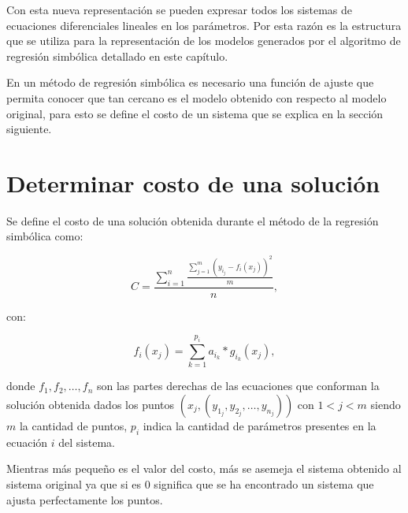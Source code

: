 
Con esta nueva representación se pueden expresar todos los sistemas de ecuaciones diferenciales lineales en los parámetros. Por esta razón es la estructura que se utiliza para la representación de los modelos generados por el algoritmo de regresión simbólica detallado en este capítulo.

En un método de regresión simbólica es necesario una función de ajuste que permita conocer que tan cercano es el modelo obtenido con respecto al modelo original, para esto se define el costo de un sistema que se explica en la sección siguiente.

\section{Determinar costo de una solución}

Se define el costo de una solución obtenida durante el método de la regresión simbólica como:

$$C = \frac{\sum_{i=1}^n\frac{\sum_{j=1}^{m}(y_{i_j} - f_i(x_j))^2}{m}}{n},$$

con:

$$f_i(x_j) = \sum_{k=1}^{p_i} a_{i_k} * g_{i_k}(x_j),$$

donde $f_1, f_2, \dots, f_n$ son las partes derechas de las ecuaciones que conforman la solución obtenida dados los puntos $(x_j, (y_{1_j}, y_{2_j}, \dots, y_{n_j}))$  con $1 < j < m$ siendo $m$ la cantidad de puntos, $p_i$ indica la cantidad de parámetros presentes en la ecuación $i$ del sistema.

Mientras más pequeño es el valor del costo, más se asemeja el sistema obtenido al sistema original ya que si es 0 significa que se ha encontrado un sistema que ajusta perfectamente los puntos.

